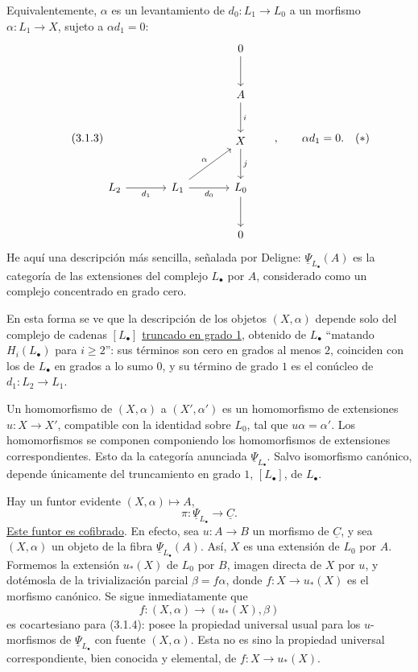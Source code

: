 Equivalentemente, $\alpha$ es un levantamiento de
$d_0:L_1\longrightarrow L_0$ a un morfismo
$\alpha:L_1\longrightarrow X$, sujeto a $\alpha d_1=0$:
\begin{equation}\tag{3.1.3}
\begin{tikzcd}[row sep=large,column sep=large]
 &&0\arrow[d]\\
 &&A\arrow[d,"i"]\\
 &&X\arrow[d,"j"]\\
 L_2\arrow[r,"d_1"']&L_1\arrow[r,"d_0"']\arrow[ru,"\alpha"]
   &L_0\arrow[d]\\
 &&0
\end{tikzcd}
\qquad,\qquad \alpha d_1=0.\quad(*)
\end{equation}
He aquí una descripción más sencilla, señalada por Deligne:
$\underline\Psi_{L_\bullet}(A)$ es la categoría de las extensiones del
complejo $L_\bullet$ por $A$, considerado como un complejo concentrado
en grado cero.

En esta forma se ve que la descripción de los objetos $(X,\alpha)$
depende solo del complejo de cadenas $[L_\bullet]$
\underline{truncado en grado 1}, obtenido de $L_\bullet$ ``matando
$H_i(L_\bullet)$ para $i\geq2$'': sus términos son cero en grados al
menos $2$, coinciden con los de $L_\bullet$ en grados a lo sumo $0$, y
su término de grado $1$ es el conúcleo de
$d_1:L_2\longrightarrow L_1$.

Un homomorfismo de $(X,\alpha)$ a $(X',\alpha')$ es un homomorfismo de
extensiones $u:X\longrightarrow X'$, compatible con la identidad
sobre $L_0$, tal que $u\alpha=\alpha'$. Los homomorfismos se componen
componiendo los homomorfismos de extensiones correspondientes. Esto da
la categoría anunciada $\underline\Psi_{L_\bullet}$. Salvo
isomorfismo canónico, depende únicamente del truncamiento en grado
$1$, $[L_\bullet]$, de $L_\bullet$.

Hay un funtor evidente $(X,\alpha)\longmapsto A$,
\begin{equation}\tag{3.1.4}
 \pi:\underline\Psi_{L_\bullet}\longrightarrow\underline C.
\end{equation}
\underline{Este funtor es cofibrado}. En efecto, sea
$u:A\longrightarrow B$ un morfismo de $\underline C$, y sea
$(X,\alpha)$ un objeto de la fibra
$\underline\Psi_{L_\bullet}(A)$. Así, $X$ es una extensión de $L_0$
por $A$. Formemos la extensión $u_*(X)$ de $L_0$ por $B$, imagen
directa de $X$ por $u$, y dotémosla de la trivialización parcial
$\beta=f\alpha$, donde $f:X\longrightarrow u_*(X)$ es el morfismo
canónico. Se sigue inmediatamente que
\[
 f:(X,\alpha)\longrightarrow(u_*(X),\beta)
\]
es cocartesiano para (3.1.4): posee la propiedad universal usual para
los $u$-morfismos de $\underline\Psi_{L_\bullet}$ con fuente
$(X,\alpha)$. Esta no es sino la propiedad universal correspondiente,
bien conocida y elemental, de $f:X\longrightarrow u_*(X)$.

